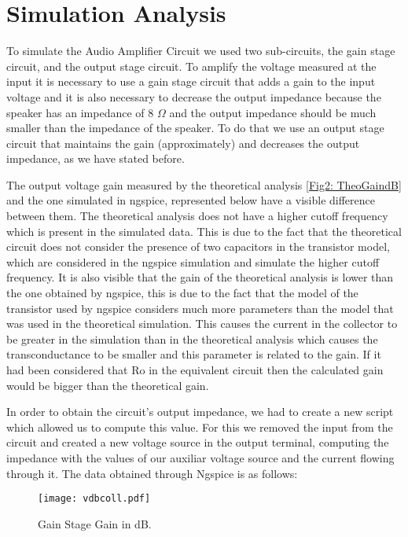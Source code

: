 \section{Simulation Analysis}
\label{sec:simulation}
To simulate the Audio Amplifier Circuit we used two sub-circuits, the gain stage circuit, and the output stage circuit.
To amplify the voltage measured at the input it is necessary to use a gain stage circuit that adds a gain to the input voltage and it is also necessary to decrease the output impedance because the speaker has an impedance of 8 $\Omega$ and the output impedance should be much smaller than the impedance of the speaker. To do that we use an output stage circuit that maintains the gain (approximately) and decreases the output impedance, as we have stated before.

The output voltage gain measured by the theoretical analysis \ref{Fig2: TheoGaindB} and the one simulated in ngspice,  represented below have a visible difference between them. The theoretical analysis does not have a higher cutoff frequency which is present in the simulated data. This is due to the fact that the theoretical circuit does not consider the presence of two capacitors in the transistor model, which are considered in the ngspice simulation and simulate the higher cutoff frequency. It is also visible that the gain of the theoretical analysis is lower than the one obtained by ngspice, this is due to the fact that the model of the transistor used by ngspice considers much more parameters than the model that was used in the theoretical simulation. This causes the current in the collector to be greater in the simulation than in the theoretical analysis which causes the transconductance to be smaller and this parameter is related to the gain.
If it had been considered that Ro in the equivalent circuit then the calculated gain would be bigger than the theoretical gain.

In order to obtain the circuit's output impedance, we had to create a new script which allowed us to compute this value. For this we removed the input from the circuit and created a new voltage source in the output terminal, computing the impedance with the values of our auxiliar voltage source and the current flowing through it.
The data obtained through Ngspice is as follows:

\begin{figure}[h] 
\centering
\texttt{[image: vdbcoll.pdf]}
\caption{Gain Stage Gain in dB.}
\label{Fig3: GainStgGaindB}
\end{figure}

